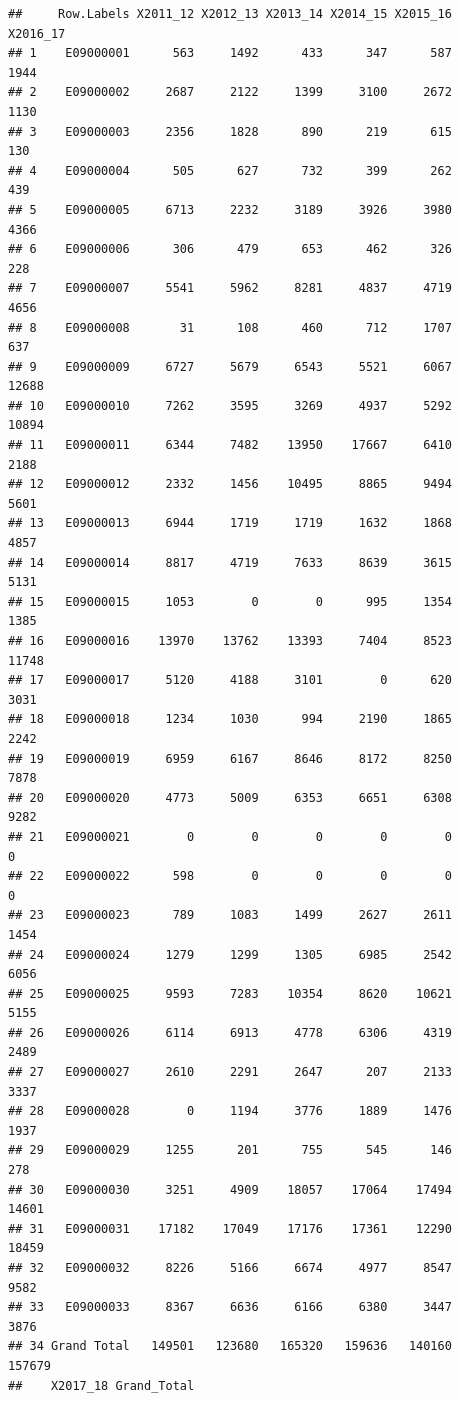 \documentclass[]{book}
\begin{document}
\begin{verbatim}
##     Row.Labels X2011_12 X2012_13 X2013_14 X2014_15 X2015_16 X2016_17
## 1    E09000001      563     1492      433      347      587     1944
## 2    E09000002     2687     2122     1399     3100     2672     1130
## 3    E09000003     2356     1828      890      219      615      130
## 4    E09000004      505      627      732      399      262      439
## 5    E09000005     6713     2232     3189     3926     3980     4366
## 6    E09000006      306      479      653      462      326      228
## 7    E09000007     5541     5962     8281     4837     4719     4656
## 8    E09000008       31      108      460      712     1707      637
## 9    E09000009     6727     5679     6543     5521     6067    12688
## 10   E09000010     7262     3595     3269     4937     5292    10894
## 11   E09000011     6344     7482    13950    17667     6410     2188
## 12   E09000012     2332     1456    10495     8865     9494     5601
## 13   E09000013     6944     1719     1719     1632     1868     4857
## 14   E09000014     8817     4719     7633     8639     3615     5131
## 15   E09000015     1053        0        0      995     1354     1385
## 16   E09000016    13970    13762    13393     7404     8523    11748
## 17   E09000017     5120     4188     3101        0      620     3031
## 18   E09000018     1234     1030      994     2190     1865     2242
## 19   E09000019     6959     6167     8646     8172     8250     7878
## 20   E09000020     4773     5009     6353     6651     6308     9282
## 21   E09000021        0        0        0        0        0        0
## 22   E09000022      598        0        0        0        0        0
## 23   E09000023      789     1083     1499     2627     2611     1454
## 24   E09000024     1279     1299     1305     6985     2542     6056
## 25   E09000025     9593     7283    10354     8620    10621     5155
## 26   E09000026     6114     6913     4778     6306     4319     2489
## 27   E09000027     2610     2291     2647      207     2133     3337
## 28   E09000028        0     1194     3776     1889     1476     1937
## 29   E09000029     1255      201      755      545      146      278
## 30   E09000030     3251     4909    18057    17064    17494    14601
## 31   E09000031    17182    17049    17176    17361    12290    18459
## 32   E09000032     8226     5166     6674     4977     8547     9582
## 33   E09000033     8367     6636     6166     6380     3447     3876
## 34 Grand Total   149501   123680   165320   159636   140160   157679
##    X2017_18 Grand_Total

\end{verbatim}
\end{document}
